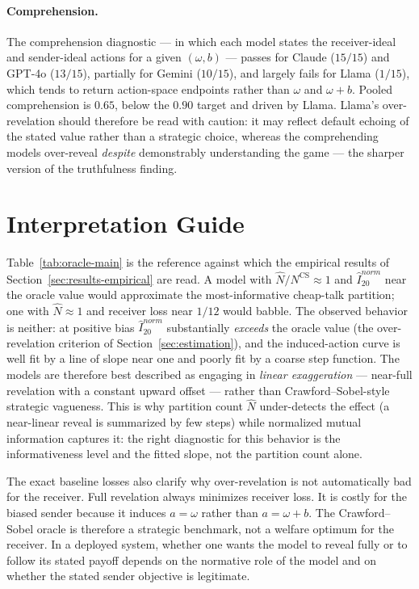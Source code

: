 \documentclass[11pt]{article}
\newcommand{\NCS}{N^{\mathrm{CS}}}
\begin{document}
\paragraph{Comprehension.}
The comprehension diagnostic --- in which each model states the receiver-ideal and sender-ideal actions for a given $(\omega,b)$ --- passes for Claude ($15/15$) and GPT-4o ($13/15$), partially for Gemini ($10/15$), and largely fails for Llama ($1/15$), which tends to return action-space endpoints rather than $\omega$ and $\omega+b$.  Pooled comprehension is $0.65$, below the $0.90$ target and driven by Llama.  Llama's over-revelation should therefore be read with caution: it may reflect default echoing of the stated value rather than a strategic choice, whereas the comprehending models over-reveal \emph{despite} demonstrably understanding the game --- the sharper version of the truthfulness finding.

\section{Interpretation Guide}\label{sec:interpretation}

Table~\ref{tab:oracle-main} is the reference against which the empirical results of Section~\ref{sec:results-empirical} are read.  A model with $\widehat N/\NCS\approx1$ and $\widehat I^{norm}_{20}$ near the oracle value would approximate the most-informative cheap-talk partition; one with $\widehat N\approx1$ and receiver loss near $1/12$ would babble.  The observed behavior is neither: at positive bias $\widehat I^{norm}_{20}$ substantially \emph{exceeds} the oracle value (the over-revelation criterion of Section~\ref{sec:estimation}), and the induced-action curve is well fit by a line of slope near one and poorly fit by a coarse step function.  The models are therefore best described as engaging in \emph{linear exaggeration} --- near-full revelation with a constant upward offset --- rather than Crawford--Sobel-style strategic vagueness.  This is why partition count $\widehat N$ under-detects the effect (a near-linear reveal is summarized by few steps) while normalized mutual information captures it: the right diagnostic for this behavior is the informativeness level and the fitted slope, not the partition count alone.

The exact baseline losses also clarify why over-revelation is not automatically bad for the receiver.  Full revelation always minimizes receiver loss.  It is costly for the biased sender because it induces $a=\omega$ rather than $a=\omega+b$.  The Crawford--Sobel oracle is therefore a strategic benchmark, not a welfare optimum for the receiver.  In a deployed system, whether one wants the model to reveal fully or to follow its stated payoff depends on the normative role of the model and on whether the stated sender objective is legitimate.
\end{document}
